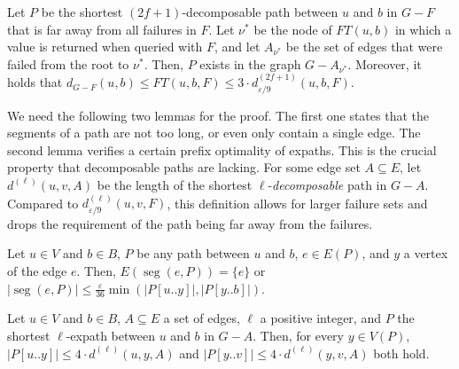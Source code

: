 \documentclass{article}\usepackage[a4paper,margin=20mm]{geometry}
\DeclareMathOperator{\seg}{seg}
\newcommand*{\length}[1]{|#1|}
\renewcommand{\le}{\leqslant}
\newcommand{\eps}{\varepsilon}
\begin{document}
\begin{lemma}
\label{lem:crucial_survival}
  Let $P$ be the shortest $(2f{+}1)$-decomposable path between $u$ and $b$ in $G-F$ 
  that is far away from all failures in $F$.
  Let $\nu^*$ be the node of $FT(u,b)$ in which a value is returned when queried with $F$, 
  and let $A_{\nu^*}$ be the set of edges that were failed from the root to $\nu^*$.
  Then, $P$ exists in the graph $G-A_{\nu^*}$.
  Moreover, it holds that 
  $d_{G-F}(u,b) \le FT(u,b,F) \le 3 \cdot d^{(2f+1)}_{\eps/9}(u,b,F)$.
\end{lemma}

We need the following two lemmas for the proof.
The first one states that the segments of a path are not too long,
or even only contain a single edge.
The second lemma verifies a certain prefix optimality of expaths.
This is the crucial property that decomposable paths are lacking.
For some edge set $A \subseteq E$,
let $d^{(\ell)}(u,v,A)$ be the length of the shortest \mbox{$\ell$-\emph{decomposable}} path in $G{-}A$.
Compared to $d^{(\ell)}_{\eps/9}(u,v,F)$,
this definition allows for larger failure sets and
drops the requirement of the path being far away from the failures.

\begin{lemma}
\label{lem:segments_not_too_large}
  Let $u \in V$ and $b \in B$,
  $P$ be any path between $u$ and $b$, $e \in E(P)$,
  and $y$ a vertex of the edge $e$.
  Then, $E(\seg(e,P)) = \{e\}$ or 
  $\length{\seg(e,P)}  \le \tfrac{\eps}{36} \min(\length{P[u..y]}, \length{P[y..b]})$. 
\end{lemma}

\begin{lemma}
\label{lem:prefix_optimality}
  Let $u \in V$ and $b \in B$, $A \subseteq E$ a set of edges, 
  $\ell$ a positive integer, and $P$ the shortest $\ell$-expath between $u$ and $b$ in $G-A$.
  Then, for every $y \in V(P)$,
  $\length{P[u..y]} \le 4 \cdot d^{(\ell)}(u,y,A)$ 
  and $\length{P[y..v]} \le 4 \cdot d^{(\ell)}(y,v,A)$ both hold.
\end{lemma}
\end{document}
